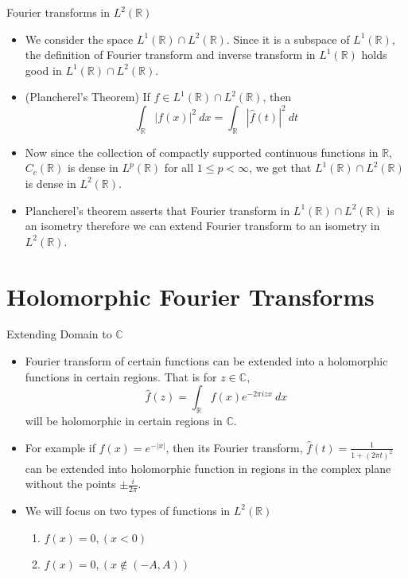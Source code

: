 \documentclass[compress]{beamer}
\newcommand{\R}{\mathbb R}
\newcommand{\C}{\mathbb C}
\begin{document}
\begin{frame}{Fourier transforms in $L^2(\R)$}
  \begin{itemize}
    \item We consider the space $L^1(\R) \cap L^2(\R)$. Since it is a subspace of $L^1(\R)$, the definition of Fourier transform and inverse transform in $L^1(\R)$ holds good in $L^1(\R) \cap L^2(\R)$.
      \pause
    \item (Plancherel's Theorem) If $f \in L^1(\R) \cap L^2(\R)$, then 
      \begin{equation}
        \int_\R |f(x)|^2 \ dx = \int_\R |\hat{f}(t)|^2 \ dt
        \label{eq:plancherel's theorem}
      \end{equation}
      \pause
    \item Now since the collection of compactly supported continuous functions in $\R$, $C_c(\R)$ is dense in $L^p(\R)$ for all $1 \le p < \infty$, we get that $L^1(\R) \cap L^2(\R)$ is dense in $L^2(\R)$.
      \pause
    \item Plancherel's theorem asserts that Fourier transform in $L^1(\R) \cap L^2(\R)$ is an isometry therefore we can extend Fourier transform to an isometry in $L^2(\R)$.
  \end{itemize}
\end{frame}


\section{Holomorphic Fourier Transforms}
\begin{frame}{Extending Domain to $\C$}
  \begin{itemize}
    \item Fourier transform of certain functions can be extended into a holomorphic functions in certain regions. That is for $z \in \C$, 
      \begin{equation}
        \hat{f}(z) = \int_\R f(x)e^{-2\pi izx} \ dx
        \label{eq:extending_to_C}
      \end{equation}
      will be holomorphic in certain regions in $\C$.
    \pause
    \item For example if $f(x) = e^{-|x|}$, then its Fourier transform, $\hat{f}(t) = \frac{1}{1+(2\pi t)^2}$ can be extended into holomorphic function in regions in the complex plane without the points $\pm \frac{i}{2\pi}$.
    \pause
    \item We will focus on two types of functions in $L^2(\R)$
      \begin{enumerate}
        \item $f(x) = 0, (x<0)$
        \item $f(x) = 0, (x \notin (-A, A))$
      \end{enumerate}
  \end{itemize}
\end{frame}
\end{document}
